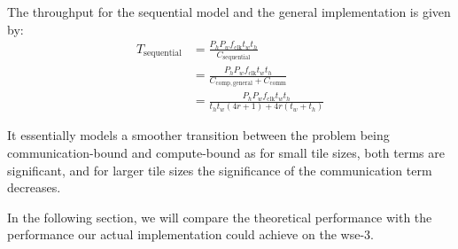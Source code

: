 The throughput for the sequential model and the general implementation is given by:
\begin{equation}
    \label{eq:throughput_sequential}
    \begin{aligned}
        T_{\mathrm{sequential}} &= \frac{P_h P_w f_{\mathrm{clk}} t_w t_h}{C_{\mathrm{sequential}}} \\[1ex]
        &= \frac{P_h P_w f_{\mathrm{clk}} t_w t_h}{C_{\mathrm{comp,general}} + C_{\mathrm{comm}}} \\[1ex]
        &= \frac{P_h P_w f_{\mathrm{clk}} t_w t_h}{t_h t_w \left(4r + 1\right) + 4r\left(t_w+t_h\right)}
    \end{aligned}
\end{equation}

It essentially models a smoother transition between the problem being communication-bound and compute-bound as for small tile sizes, both terms are significant, and for larger tile sizes the significance of the communication term decreases.

In the following section, we will compare the theoretical performance with the performance our actual implementation could achieve on the \ac{wse}-3.